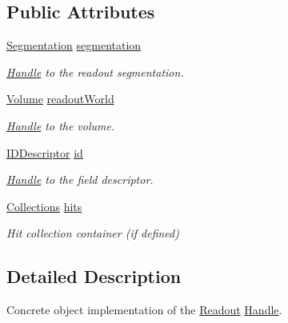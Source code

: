 \subsection*{Public Attributes}
\begin{DoxyCompactItemize}
\item 
\hyperlink{class_d_d4hep_1_1_geometry_1_1_segmentation}{Segmentation} \hyperlink{class_d_d4hep_1_1_geometry_1_1_readout_object_ac9e7bca00d99bd317bdd942c9ab132d5}{segmentation}
\begin{DoxyCompactList}\small\item\em \hyperlink{class_d_d4hep_1_1_handle}{Handle} to the readout segmentation. \end{DoxyCompactList}\item 
\hyperlink{class_d_d4hep_1_1_geometry_1_1_volume}{Volume} \hyperlink{class_d_d4hep_1_1_geometry_1_1_readout_object_ac4b6fc2857d2794caa59a544de8b2579}{readout\+World}
\begin{DoxyCompactList}\small\item\em \hyperlink{class_d_d4hep_1_1_handle}{Handle} to the volume. \end{DoxyCompactList}\item 
\hyperlink{class_d_d4hep_1_1_geometry_1_1_i_d_descriptor}{I\+D\+Descriptor} \hyperlink{class_d_d4hep_1_1_geometry_1_1_readout_object_a46cd564f02d0c5c82382fe75f6bae2eb}{id}
\begin{DoxyCompactList}\small\item\em \hyperlink{class_d_d4hep_1_1_handle}{Handle} to the field descriptor. \end{DoxyCompactList}\item 
\hyperlink{class_d_d4hep_1_1_geometry_1_1_readout_object_a1093be792a71654cf6116686b0ab7cb6}{Collections} \hyperlink{class_d_d4hep_1_1_geometry_1_1_readout_object_a07fe52ab89e2b0806f68da5eea1d8899}{hits}
\begin{DoxyCompactList}\small\item\em Hit collection container (if defined) \end{DoxyCompactList}\end{DoxyCompactItemize}


\subsection{Detailed Description}
Concrete object implementation of the \hyperlink{class_d_d4hep_1_1_geometry_1_1_readout}{Readout} \hyperlink{class_d_d4hep_1_1_handle}{Handle}. 

